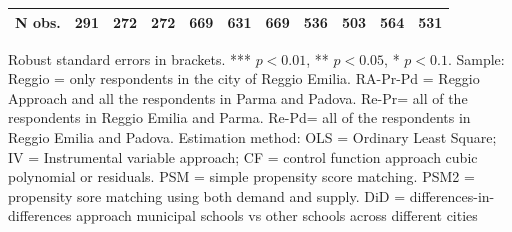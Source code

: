 \documentclass[12pt]{article}
\begin{document}
\begin{table}[ht]
\begin{center}
\begin{adjustbox}{width=1.2\textwidth,center=\textwidth}
\begin{tabular}{l*{10}{c}}
\hline
N obs. &  291 & 272 & 272 & 669 & 631 & 669 & 536 & 503 & 564 & 531 \\
\hline
\end{tabular}
\end{adjustbox}
\end{center}

\begin{footnotesize}
\raggedright{Robust standard errors in brackets. *** $p<0.01$, ** $p<0.05$, * $p<0.1$. Sample: Reggio = only respondents in the city of Reggio Emilia. RA-Pr-Pd = Reggio Approach and all the respondents in Parma and Padova. Re-Pr= all of the respondents in Reggio Emilia and Parma. Re-Pd= all of the respondents in Reggio Emilia and Padova. Estimation method: OLS = Ordinary Least Square; IV = Instrumental variable approach; CF = control function approach cubic polynomial or residuals. PSM = simple propensity score matching. PSM2 = propensity sore matching using both demand and supply. DiD = differences-in-differences approach municipal schools vs other schools across different cities}
\end{footnotesize}
\end{table}
\end{document}

